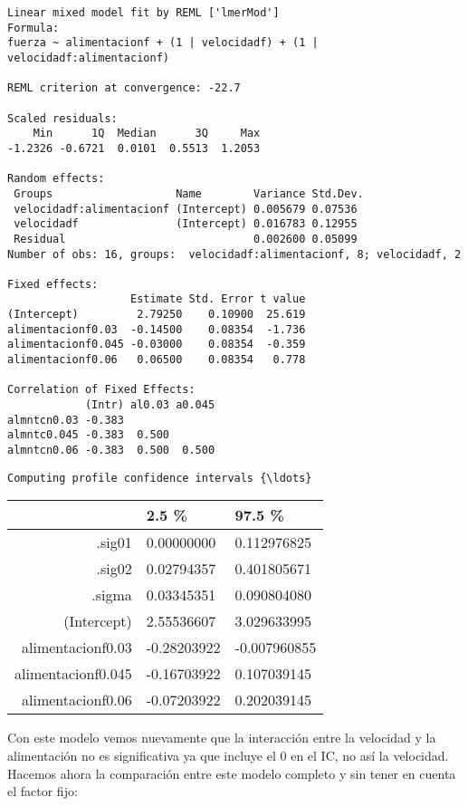 \documentclass[11pt]{article}
\begin{document}
    
    \begin{verbatim}
Linear mixed model fit by REML ['lmerMod']
Formula: 
fuerza ~ alimentacionf + (1 | velocidadf) + (1 | velocidadf:alimentacionf)

REML criterion at convergence: -22.7

Scaled residuals: 
    Min      1Q  Median      3Q     Max 
-1.2326 -0.6721  0.0101  0.5513  1.2053 

Random effects:
 Groups                   Name        Variance Std.Dev.
 velocidadf:alimentacionf (Intercept) 0.005679 0.07536 
 velocidadf               (Intercept) 0.016783 0.12955 
 Residual                             0.002600 0.05099 
Number of obs: 16, groups:  velocidadf:alimentacionf, 8; velocidadf, 2

Fixed effects:
                   Estimate Std. Error t value
(Intercept)         2.79250    0.10900  25.619
alimentacionf0.03  -0.14500    0.08354  -1.736
alimentacionf0.045 -0.03000    0.08354  -0.359
alimentacionf0.06   0.06500    0.08354   0.778

Correlation of Fixed Effects:
            (Intr) al0.03 a0.045
almntcn0.03 -0.383              
almntc0.045 -0.383  0.500       
almntcn0.06 -0.383  0.500  0.500
    \end{verbatim}

    
    \begin{Verbatim}[commandchars=\\\{\}]
Computing profile confidence intervals {\ldots}

    \end{Verbatim}

    \begin{tabular}{r|ll}
  & 2.5 \% & 97.5 \%\\
\hline
	.sig01 &  0.00000000  &  0.112976825\\
	.sig02 &  0.02794357  &  0.401805671\\
	.sigma &  0.03345351  &  0.090804080\\
	(Intercept) &  2.55536607  &  3.029633995\\
	alimentacionf0.03 & -0.28203922  & -0.007960855\\
	alimentacionf0.045 & -0.16703922  &  0.107039145\\
	alimentacionf0.06 & -0.07203922  &  0.202039145\\
\end{tabular}


    
    Con este modelo vemos nuevamente que la interacción entre la velocidad y
la alimentación no es significativa ya que incluye el 0 en el IC, no así
la velocidad. Hacemos ahora la comparación entre este modelo completo y
sin tener en cuenta el factor fijo:
\end{document}
